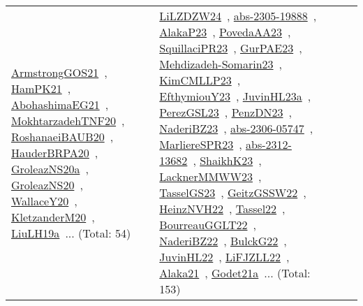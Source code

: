 {\begin{longtable}{lp{3cm}>{\raggedright\arraybackslash}p{6cm}>{\raggedright\arraybackslash}p{6cm}>{\raggedright\arraybackslash}p{8cm}}
\href{../works/ArmstrongGOS21.pdf}{ArmstrongGOS21}~\cite{ArmstrongGOS21}, \href{../works/HamPK21.pdf}{HamPK21}~\cite{HamPK21}, \href{../works/AbohashimaEG21.pdf}{AbohashimaEG21}~\cite{AbohashimaEG21}, \href{../works/MokhtarzadehTNF20.pdf}{MokhtarzadehTNF20}~\cite{MokhtarzadehTNF20}, \href{../works/RoshanaeiBAUB20.pdf}{RoshanaeiBAUB20}~\cite{RoshanaeiBAUB20}, \href{../works/HauderBRPA20.pdf}{HauderBRPA20}~\cite{HauderBRPA20}, \href{../works/GroleazNS20a.pdf}{GroleazNS20a}~\cite{GroleazNS20a}, \href{../works/GroleazNS20.pdf}{GroleazNS20}~\cite{GroleazNS20}, \href{../works/WallaceY20.pdf}{WallaceY20}~\cite{WallaceY20}, \href{../works/KletzanderM20.pdf}{KletzanderM20}~\cite{KletzanderM20}, \href{../works/LiuLH19a.pdf}{LiuLH19a}~\cite{LiuLH19a}... (Total: 54) & \href{../works/LiLZDZW24.pdf}{LiLZDZW24}~\cite{LiLZDZW24}, \href{../works/abs-2305-19888.pdf}{abs-2305-19888}~\cite{abs-2305-19888}, \href{../works/AlakaP23.pdf}{AlakaP23}~\cite{AlakaP23}, \href{../works/PovedaAA23.pdf}{PovedaAA23}~\cite{PovedaAA23}, \href{../works/SquillaciPR23.pdf}{SquillaciPR23}~\cite{SquillaciPR23}, \href{../works/GurPAE23.pdf}{GurPAE23}~\cite{GurPAE23}, \href{../works/Mehdizadeh-Somarin23.pdf}{Mehdizadeh-Somarin23}~\cite{Mehdizadeh-Somarin23}, \href{../works/KimCMLLP23.pdf}{KimCMLLP23}~\cite{KimCMLLP23}, \href{../works/EfthymiouY23.pdf}{EfthymiouY23}~\cite{EfthymiouY23}, \href{../works/JuvinHL23a.pdf}{JuvinHL23a}~\cite{JuvinHL23a}, \href{../works/PerezGSL23.pdf}{PerezGSL23}~\cite{PerezGSL23}, \href{../works/PenzDN23.pdf}{PenzDN23}~\cite{PenzDN23}, \href{../works/NaderiBZ23.pdf}{NaderiBZ23}~\cite{NaderiBZ23}, \href{../works/abs-2306-05747.pdf}{abs-2306-05747}~\cite{abs-2306-05747}, \href{../works/MarliereSPR23.pdf}{MarliereSPR23}~\cite{MarliereSPR23}, \href{../works/abs-2312-13682.pdf}{abs-2312-13682}~\cite{abs-2312-13682}, \href{../works/ShaikhK23.pdf}{ShaikhK23}~\cite{ShaikhK23}, \href{../works/LacknerMMWW23.pdf}{LacknerMMWW23}~\cite{LacknerMMWW23}, \href{../works/TasselGS23.pdf}{TasselGS23}~\cite{TasselGS23}, \href{../works/GeitzGSSW22.pdf}{GeitzGSSW22}~\cite{GeitzGSSW22}, \href{../works/HeinzNVH22.pdf}{HeinzNVH22}~\cite{HeinzNVH22}, \href{../works/Tassel22.pdf}{Tassel22}~\cite{Tassel22}, \href{../works/BourreauGGLT22.pdf}{BourreauGGLT22}~\cite{BourreauGGLT22}, \href{../works/NaderiBZ22.pdf}{NaderiBZ22}~\cite{NaderiBZ22}, \href{../works/BulckG22.pdf}{BulckG22}~\cite{BulckG22}, \href{../works/JuvinHL22.pdf}{JuvinHL22}~\cite{JuvinHL22}, \href{../works/LiFJZLL22.pdf}{LiFJZLL22}~\cite{LiFJZLL22}, \href{../works/Alaka21.pdf}{Alaka21}~\cite{Alaka21}, \href{../works/Godet21a.pdf}{Godet21a}~\cite{Godet21a}... (Total: 153)\\

\end{longtable}}
